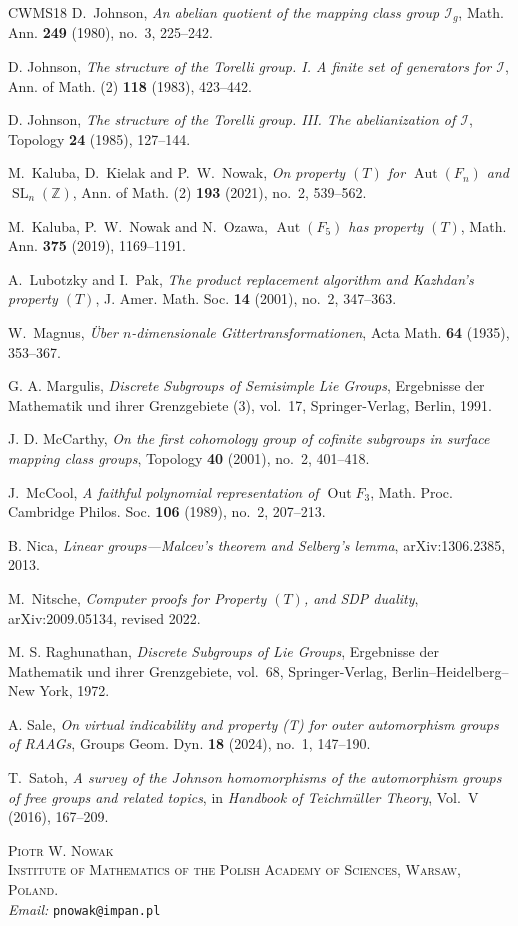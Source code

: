 \documentclass[11pt,a4paper]{article}
\theoremstyle{definition}
\newcommand{\Z}{\mathbb Z}
\newcommand{\SL}{\operatorname{SL}}
\newcommand{\Aut}{\operatorname{Aut}}
\begin{document}
\begin{thebibliography}{CWMS18}
D.~Johnson, \emph{An abelian quotient of the mapping class group
\(\mathcal I_g\)}, Math. Ann. \textbf{249} (1980), no.~3, 225--242.


D. Johnson, \emph{The structure of the Torelli group. I. A finite set
of generators for \(\mathcal I\)}, Ann. of Math. (2)
\textbf{118} (1983), 423--442.

D. Johnson, \emph{The structure of the Torelli group. III.
The abelianization of \(\mathcal I\)}, Topology \textbf{24}
(1985), 127--144.

M.~Kaluba, D.~Kielak and P.~W.~Nowak,
\emph{On property \((T)\) for \(\Aut(F_n)\) and
\(\SL_n(\Z)\)},
Ann. of Math. (2) \textbf{193} (2021), no.~2, 539--562.

M.~Kaluba, P.~W.~Nowak and N.~Ozawa,
\emph{\(\Aut(F_5)\) has property \((T)\)},
Math. Ann. \textbf{375} (2019), 1169--1191.

A.~Lubotzky and I.~Pak,
\emph{The product replacement algorithm and Kazhdan's property
\((T)\)},
J. Amer. Math. Soc. \textbf{14} (2001), no.~2, 347--363.

W.~Magnus, \emph{\"Uber \(n\)-dimensionale Gittertransformationen},
Acta Math. \textbf{64} (1935), 353--367.

G. A. Margulis, \emph{Discrete Subgroups of Semisimple Lie Groups},
Ergebnisse der Mathematik und ihrer Grenzgebiete (3), vol.~17,
Springer-Verlag, Berlin, 1991.

J. D. McCarthy, \emph{On the first cohomology group of cofinite
subgroups in surface mapping class groups}, Topology
\textbf{40} (2001), no.~2, 401--418.


J.~McCool, \emph{A faithful polynomial representation of
\(\operatorname{Out} F_3\)},
Math. Proc. Cambridge Philos. Soc. \textbf{106} (1989), no.~2, 207--213.

B. Nica, \emph{Linear groups---Malcev's theorem and Selberg's lemma},
arXiv:1306.2385, 2013.

M.~Nitsche,
\emph{Computer proofs for Property \((T)\), and SDP duality},
arXiv:2009.05134, revised 2022.

M. S. Raghunathan, \emph{Discrete Subgroups of Lie Groups},
Ergebnisse der Mathematik und ihrer Grenzgebiete, vol.~68,
Springer-Verlag, Berlin--Heidelberg--New York, 1972.


A. Sale,
\emph{On virtual indicability and property (T) for outer
automorphism groups of RAAGs},
Groups Geom. Dyn. \textbf{18} (2024), no.~1, 147--190.


T.~Satoh,
\emph{A survey of the Johnson homomorphisms of the automorphism
groups of free groups and related topics},
in \emph{Handbook of Teichm\"uller Theory}, Vol.~V (2016),
167--209.


\end{thebibliography}

\bigskip
\noindent

\noindent\textsc{Piotr W. Nowak}\\ \textsc{Institute of Mathematics of the Polish Academy of Sciences, Warsaw, Poland.}\\
\textit{Email:} \texttt{pnowak@impan.pl}\\[0.5em]
\end{document}
